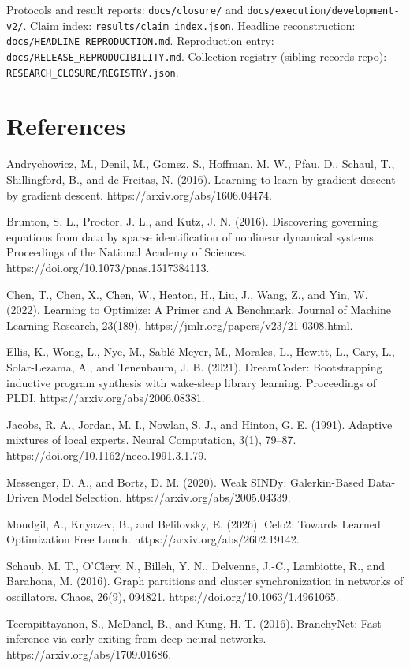 \documentclass[
  11pt,
  a4paper,
]{article}
\begin{document}
Protocols and result reports: \texttt{docs/closure/} and
\texttt{docs/execution/development-v2/}. Claim index:
\texttt{results/claim\_index.json}. Headline reconstruction:
\texttt{docs/HEADLINE\_REPRODUCTION.md}. Reproduction entry:
\texttt{docs/RELEASE\_REPRODUCIBILITY.md}. Collection registry (sibling
records repo): \texttt{RESEARCH\_CLOSURE/REGISTRY.json}.

\section{References}\label{references}

Andrychowicz, M., Denil, M., Gomez, S., Hoffman, M. W., Pfau, D.,
Schaul, T., Shillingford, B., and de Freitas, N. (2016). Learning to
learn by gradient descent by gradient descent.
https://arxiv.org/abs/1606.04474.

Brunton, S. L., Proctor, J. L., and Kutz, J. N. (2016). Discovering
governing equations from data by sparse identification of nonlinear
dynamical systems. Proceedings of the National Academy of Sciences.
https://doi.org/10.1073/pnas.1517384113.

Chen, T., Chen, X., Chen, W., Heaton, H., Liu, J., Wang, Z., and Yin, W.
(2022). Learning to Optimize: A Primer and A Benchmark. Journal of
Machine Learning Research, 23(189).
https://jmlr.org/papers/v23/21-0308.html.

Ellis, K., Wong, L., Nye, M., Sablé-Meyer, M., Morales, L., Hewitt, L.,
Cary, L., Solar-Lezama, A., and Tenenbaum, J. B. (2021). DreamCoder:
Bootstrapping inductive program synthesis with wake-sleep library
learning. Proceedings of PLDI. https://arxiv.org/abs/2006.08381.

Jacobs, R. A., Jordan, M. I., Nowlan, S. J., and Hinton, G. E. (1991).
Adaptive mixtures of local experts. Neural Computation, 3(1), 79--87.
https://doi.org/10.1162/neco.1991.3.1.79.

Messenger, D. A., and Bortz, D. M. (2020). Weak SINDy: Galerkin-Based
Data-Driven Model Selection. https://arxiv.org/abs/2005.04339.

Moudgil, A., Knyazev, B., and Belilovsky, E. (2026). Celo2: Towards
Learned Optimization Free Lunch. https://arxiv.org/abs/2602.19142.

Schaub, M. T., O'Clery, N., Billeh, Y. N., Delvenne, J.-C., Lambiotte,
R., and Barahona, M. (2016). Graph partitions and cluster
synchronization in networks of oscillators. Chaos, 26(9), 094821.
https://doi.org/10.1063/1.4961065.

Teerapittayanon, S., McDanel, B., and Kung, H. T. (2016). BranchyNet:
Fast inference via early exiting from deep neural networks.
https://arxiv.org/abs/1709.01686.
\end{document}
